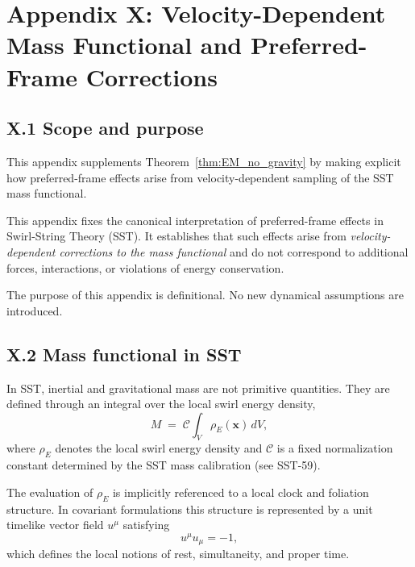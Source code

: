 \documentclass[10pt]{article}
\begin{document}
    \section*{Appendix X: Velocity-Dependent Mass Functional and Preferred-Frame Corrections}

    \subsection*{X.1 Scope and purpose}

        This appendix supplements Theorem~\ref{thm:EM_no_gravity} by making explicit
        how preferred-frame effects arise from velocity-dependent sampling of the
        SST mass functional.

        This appendix fixes the canonical interpretation of preferred-frame effects in
        Swirl-String Theory (SST). It establishes that such effects arise from
        \emph{velocity-dependent corrections to the mass functional} and do not correspond
        to additional forces, interactions, or violations of energy conservation.

        The purpose of this appendix is definitional. No new dynamical assumptions are
        introduced.

    \subsection*{X.2 Mass functional in SST}

        In SST, inertial and gravitational mass are not primitive quantities.
        They are defined through an integral over the local swirl energy density,
        \begin{equation}
            M \;=\; \mathcal{C} \int_V \rho_{\!E}(\mathbf{x}) \, dV ,
        \end{equation}
        where $\rho_{\!E}$ denotes the local swirl energy density and $\mathcal{C}$ is a
        fixed normalization constant determined by the SST mass calibration
        (see SST-59).

        The evaluation of $\rho_{\!E}$ is implicitly referenced to a local clock and
        foliation structure. In covariant formulations this structure is represented
        by a unit timelike vector field $u^\mu$ satisfying
        \begin{equation}
            u^\mu u_\mu = -1 ,
        \end{equation}
        which defines the local notions of rest, simultaneity, and proper time.
\end{document}
